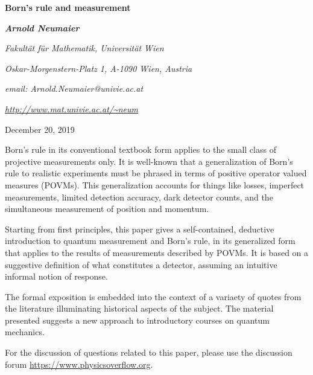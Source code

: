 \documentclass[12pt]{article}
\begin{document}
\begin{center}
{\LARGE \bf Born's rule and measurement} \\

\vspace{1cm}

\centerline{\sl {\large \bf Arnold Neumaier}}

\vspace{0.5cm}

\centerline{\sl Fakult\"at f\"ur Mathematik, Universit\"at Wien}
\centerline{\sl Oskar-Morgenstern-Platz 1, A-1090 Wien, Austria}
\centerline{\sl email: Arnold.Neumaier@univie.ac.at}
\centerline{\sl \url{http://www.mat.univie.ac.at/~neum}}

\end{center}


\hfill December 20, 2019

\vspace{0.5cm}



\bigskip
{}
Born's rule in its conventional textbook form applies to the small
class of projective measurements only. It is well-known that a
generalization of Born's rule to realistic experiments must be phrased
in terms of positive operator valued measures (POVMs). This
generalization accounts for things like losses, imperfect measurements,
limited detection accuracy, dark detector counts, and the simultaneous
measurement of position and momentum.

Starting from first principles, this paper gives a self-contained,
deductive introduction to quantum measurement and Born's rule, in its 
generalized form that applies to the results of measurements described 
by POVMs. It is based on a suggestive definition of what constitutes a 
detector, assuming an intuitive informal notion of response. 

The formal exposition is embedded into the context of a variaety of 
quotes from the literature illuminating historical aspects of the 
subject. The material presented suggests a new approach to introductory 
courses on quantum mechanics.

\bigskip
\noindent
For the discussion of questions related to this paper, please use
the discussion forum \url{https://www.physicsoverflow.org}.
\end{document}
